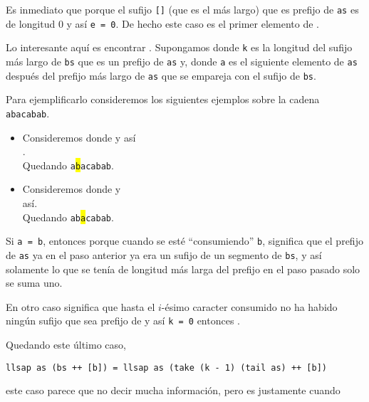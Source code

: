 Es inmediato que  porque el sufijo \texttt{[]} (que es el más largo) que
es prefijo de \texttt{as} es de longitud 0 y así \texttt{e = 0}. De hecho este caso es el primer
elemento de .

Lo interesante aquí es encontrar . Supongamos donde \texttt{k}
es la longitud del sufijo más largo de \texttt{bs} que es un prefijo de \texttt{as} y,
 donde \texttt{a} es el siguiente elemento de \texttt{as} después
del prefijo más largo de \texttt{as} que se empareja con el sufijo de \texttt{bs}.

Para ejemplificarlo consideremos los siguientes ejemplos sobre la cadena \texttt{abacabab}.
\begin{itemize}
\item Consideremos donde y así\\
.\\
Quedando \texttt{a\colorbox{yellow}b}\texttt{acabab}.
\item Consideremos donde y\\
así.\\
Quedando \texttt{ab\colorbox{yellow}a}\texttt{cabab}.
\end{itemize}

Si \texttt{a = b}, entonces  porque cuando se esté
``consumiendo'' \texttt{b}, significa que el prefijo de \texttt{as} ya en el paso anterior ya era
un sufijo de un segmento de \texttt{bs}, y así solamente lo que se tenía de longitud más larga del
prefijo en el paso pasado solo se suma uno.

En otro caso significa que hasta el $i$-ésimo caracter consumido no ha habido ningún sufijo que sea
prefijo de y así \texttt{k = 0} entonces .

Quedando este último caso,
\begin{verbatim}
llsap as (bs ++ [b]) = llsap as (take (k - 1) (tail as) ++ [b])
\end{verbatim}
este caso parece que no decir mucha información, pero es justamente cuando %


